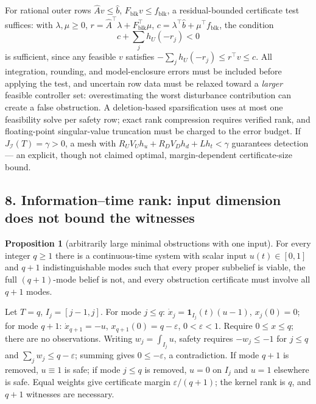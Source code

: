 \documentclass[10pt,twocolumn]{article}
\theoremstyle{definition}
\newtheorem{proposition}{Proposition}
\begin{document}
For rational outer rows \(\widehat A v \le \widehat b\),
\(F_{\mathrm{blk}} v \le f_{\mathrm{blk}}\), a residual-bounded certificate
test suffices: with \(\lambda, \mu \ge 0\), \(r = \widehat A^\top \lambda +
F_{\mathrm{blk}}^\top \mu\), \(c = \lambda^\top \widehat b + \mu^\top
f_{\mathrm{blk}}\), the condition
\[
c + \sum_j h_U(-r_j) < 0
\tag{15}
\]
is sufficient, since any feasible \(v\) satisfies \(-\sum_j h_U(-r_j) \le
r^\top v \le c\). All integration, rounding, and model-enclosure errors must
be included before applying the test, and uncertain row data must be relaxed
toward a \emph{larger} feasible controller set: overestimating the worst
disturbance contribution can create a false obstruction. A deletion-based
sparsification uses at most one feasibility solve per safety row; exact rank
compression requires verified rank, and floating-point singular-value
truncation must be charged to the error budget. If
\(J_{\mathcal{I}}(T) = \gamma > 0\), a mesh with \(R_U V_U h_u + R_D V_D h_d
+ L h_t < \gamma\) guarantees detection --- an explicit, though not claimed
optimal, margin-dependent certificate-size bound.

\subsection{8. Information--time rank: input dimension does not bound the witnesses}\label{rank}

\begin{proposition}[arbitrarily large minimal obstructions with one input]\label{prop:rank}
For every integer \(q \ge 1\) there is a continuous-time system with scalar
input \(u(t) \in [0,1]\) and \(q+1\) indistinguishable modes such that every
proper subbelief is viable, the full \((q{+}1)\)-mode belief is not, and every
obstruction certificate must involve all \(q+1\) modes.
\end{proposition}

Let \(T = q\), \(I_j = [j-1, j]\). For mode \(j \le q\):
\(\dot x_j = \mathbf{1}_{I_j}(t)(u - 1)\), \(x_j(0) = 0\); for mode \(q+1\):
\(\dot x_{q+1} = -u\), \(x_{q+1}(0) = q - \varepsilon\), \(0 < \varepsilon <
1\). Require \(0 \le x \le q\); there are no observations. Writing \(w_j =
\int_{I_j} u\), safety requires \(-w_j \le -1\) for \(j \le q\) and \(\sum_j
w_j \le q - \varepsilon\); summing gives \(0 \le -\varepsilon\), a
contradiction. If mode \(q+1\) is removed, \(u \equiv 1\) is safe; if mode
\(j \le q\) is removed, \(u = 0\) on \(I_j\) and \(u = 1\) elsewhere is safe.
Equal weights give certificate margin \(\varepsilon/(q+1)\); the kernel rank
is \(q\), and \(q+1\) witnesses are necessary.
\end{document}
